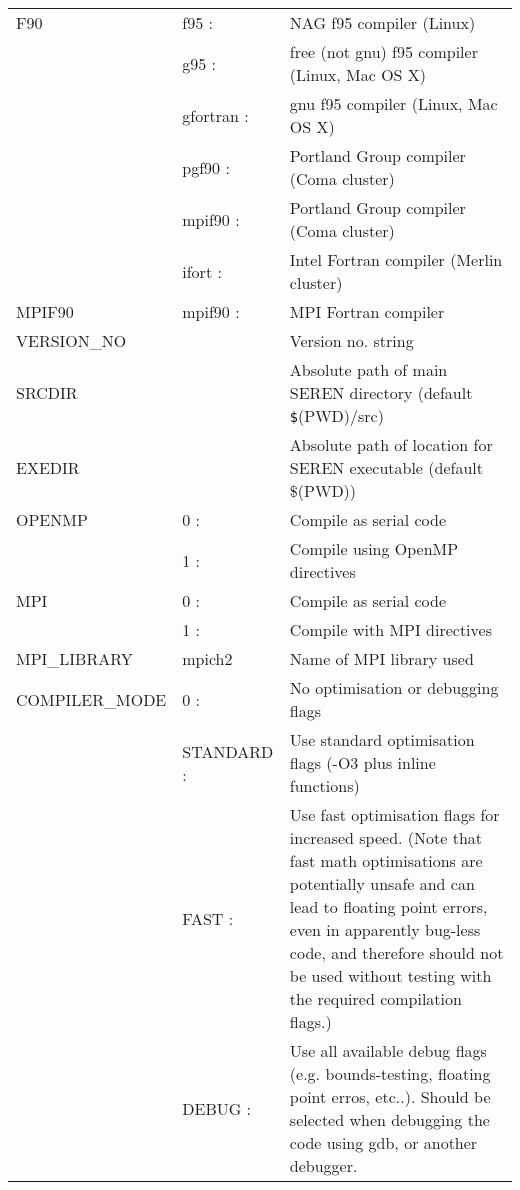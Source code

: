\documentclass[a4paper]{article}
\newcommand{\var}[1]{\texttt{#1}}
\begin{document}
\tabletail{\hline}
\tablelasttail{\hline}
\begin{center}
\begin{supertabular}{|p{4.6cm}|p{4.6cm} p{6.4cm}|}
 F90           & f95      :& NAG f95 compiler (Linux) \\
               & g95      :& free (not gnu) f95 compiler (Linux, Mac OS X)  \\
	       & gfortran :& gnu f95 compiler (Linux, Mac OS X) \\
               & pgf90    :& Portland Group compiler (Coma cluster) \\ 
               & mpif90   :& Portland Group compiler (Coma cluster) \\ 
	       & ifort    :& Intel Fortran compiler (Merlin cluster) \\ \hline

 MPIF90        & mpif90   :& MPI Fortran compiler \\ \hline

 VERSION\_NO   & & Version no. string \\ \hline

 SRCDIR        & & Absolute path of main SEREN directory (default {\var \$(PWD)/src}) \\ \hline

 EXEDIR        & & Absolute path of location for SEREN executable (default {\$(PWD)}) \\ \hline

 OPENMP        & 0 :& Compile as serial code\\
               & 1 :& Compile using OpenMP directives \\ \hline

 MPI           & 0 :& Compile as serial code\\
               & 1 :& Compile with MPI directives \\ \hline

 MPI\_LIBRARY  & mpich2 & Name of MPI library used \\ \hline

 COMPILER\_MODE & 0 :& No optimisation or debugging flags \\
               & STANDARD :& Use standard optimisation flags (-O3 plus inline functions) \\
               & FAST     :& Use fast optimisation flags for increased speed.  (Note that fast math optimisations are potentially unsafe and can lead to floating point errors, even in apparently bug-less code, and therefore should not be used without testing with the required compilation flags.) \\
               & DEBUG    :& Use all available debug flags (e.g. bounds-testing, floating point erros, etc..).  Should be selected when debugging the code using gdb, or another debugger. \\ \hline


\end{supertabular}
\end{center}
\end{document}
